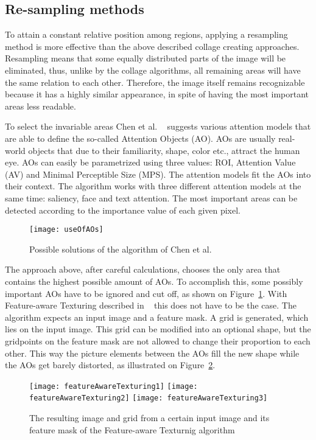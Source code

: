 \documentclass[draft,final]{vutinfth} %
\begin{document}
	\subsection{Re-sampling methods}
	To attain a constant relative position among regions, applying a resampling method is more effective than the above described collage creating approaches.
	Resampling means that some equally distributed parts of the image will be eliminated, thus, unlike by the collage algorithms, all remaining areas will have the same relation to each other.
	Therefore, the image itself remains recognizable because it has a highly similar appearance, in spite of having the most important areas less readable.\par 
	To select the invariable areas Chen et al. ~\cite{chen2003visual} suggests various attention models that are able to define the so-called Attention Objects (AO).
	AOs are usually real-world objects that due to their familiarity, shape, color etc., attract the human eye.
	AOs can easily be parametrized using three values: ROI, Attention Value (AV) and Minimal Perceptible Size (MPS).
	The attention models fit the AOs into their context.
	The algorithm works with three different attention models at the same time: saliency, face and text attention.
	The most important areas can be detected according to the importance value of each given pixel.\par 
	\begin{figure}[h]
		\centering		
		\texttt{[image: useOfAOs]}
		\caption{Possible solutions of the algorithm of Chen et al. ~\cite{chen2003visual}}
		\label{fig:useOfAOs}
	\end{figure}
	The approach above, after careful calculations, chooses the only area that contains the highest possible amount of AOs.
	To accomplish this, some possibly important AOs have to be ignored and cut off, as shown on Figure~\ref{fig:useOfAOs}.
	With Feature-aware Texturing described in ~\cite{gal2006feature} this does not have to be the case.
	The algorithm expects an input image and a feature mask.
	A grid is generated, which lies on the input image.
	This grid can be modified into an optional shape, but the gridpoints on the feature mask are not allowed to change their proportion to each other.
	This way the picture elements between the AOs fill the new shape while the AOs get barely distorted, as illustrated on Figure~\ref{fig:fat}.\par 
	 \begin{figure}[h]
		\texttt{[image: featureAwareTexturing1]}\hfill
		\texttt{[image: featureAwareTexturing2]}\hfill
		\texttt{[image: featureAwareTexturing3]}
		\caption{The resulting image and grid from a certain input image and its feature mask of the Feature-aware Texturnig algorithm ~\cite{gal2006feature} }
		\label{fig:fat}
	\end{figure}
\end{document}
